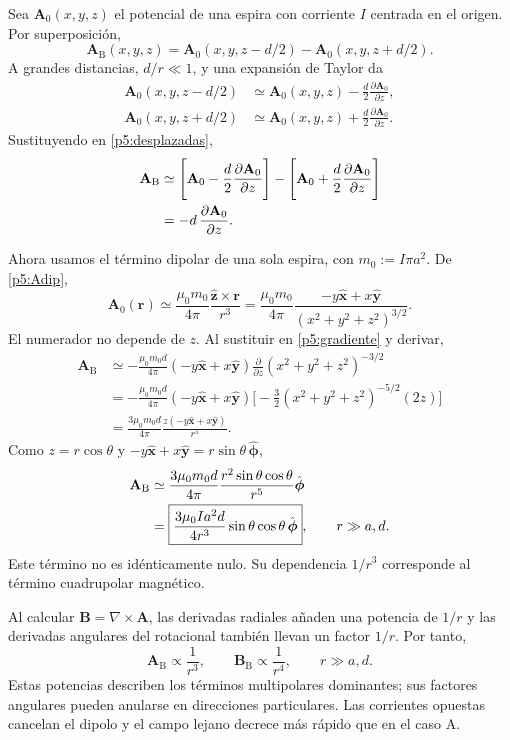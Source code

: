 \documentclass[11pt]{article}
\newcommand{\ex}{\hat{\mathbf{x}}}
\newcommand{\ey}{\hat{\mathbf{y}}}
\newcommand{\ez}{\hat{\mathbf{z}}}
\newcommand{\ep}{\hat{\boldsymbol{\phi}}}
\begin{document}
Sea $\mathbf A_0(x,y,z)$ el potencial de una espira con corriente
$I$ centrada en el origen. Por superposición,
\begin{equation}
  \mathbf A_{\mathrm B}(x,y,z)
    =\mathbf A_0(x,y,z-d/2)
      -\mathbf A_0(x,y,z+d/2).
  \label{p5:desplazadas}
\end{equation}
A grandes distancias, $d/r\ll1$, y una expansión de Taylor da
\begin{align*}
  \mathbf A_0(x,y,z-d/2)
    &\simeq\mathbf A_0(x,y,z)
      -\frac d2\frac{\partial\mathbf A_0}{\partial z},\\
  \mathbf A_0(x,y,z+d/2)
    &\simeq\mathbf A_0(x,y,z)
      +\frac d2\frac{\partial\mathbf A_0}{\partial z}.
\end{align*}
Sustituyendo en \eqref{p5:desplazadas},
\begin{align}
  \mathbf A_{\mathrm B}
    &\simeq
      \Biggl[\mathbf A_0-\frac d2
        \frac{\partial\mathbf A_0}{\partial z}\Biggr]
      -\Biggl[\mathbf A_0+\frac d2
        \frac{\partial\mathbf A_0}{\partial z}\Biggr]
      \notag\\
    &=-d\,\frac{\partial\mathbf A_0}{\partial z}.
      \label{p5:gradiente}
\end{align}

Ahora usamos el término dipolar de una sola espira,
con $m_0:=I\pi a^2$. De \eqref{p5:Adip},
\[
  \mathbf A_0(\mathbf r)
    \simeq\frac{\mu_0m_0}{4\pi}
      \frac{\ez\times\mathbf r}{r^3}
    =\frac{\mu_0m_0}{4\pi}
      \frac{-y\ex+x\ey}{(x^2+y^2+z^2)^{3/2}}.
\]
El numerador no depende de $z$. Al sustituir en
\eqref{p5:gradiente} y derivar,
\begin{align*}
  \mathbf A_{\mathrm B}
    &\simeq-\frac{\mu_0m_0d}{4\pi}
      (-y\ex+x\ey)
      \frac{\partial}{\partial z}
      (x^2+y^2+z^2)^{-3/2}\\
    &=-\frac{\mu_0m_0d}{4\pi}
      (-y\ex+x\ey)
      \Biggl[-\frac32(x^2+y^2+z^2)^{-5/2}(2z)\Biggr]\\
    &=\frac{3\mu_0m_0d}{4\pi}
      \frac{z(-y\ex+x\ey)}{r^5}.
\end{align*}
Como $z=r\cos\theta$ y $-y\ex+x\ey=r\sin\theta\,\ep$,
\begin{align}
  \mathbf A_{\mathrm B}
    &\simeq\frac{3\mu_0m_0d}{4\pi}
      \frac{r^2\sin\theta\cos\theta}{r^5}\ep
      \notag\\
    &=\boxed{
       \frac{3\mu_0Ia^2d}{4r^3}
       \sin\theta\cos\theta\,\ep
      },
      \qquad r\gg a,d.
      \label{p5:AB}
\end{align}
Este término no es idénticamente nulo. Su dependencia $1/r^3$
corresponde al término cuadrupolar magnético.

Al calcular $\mathbf B=\nabla\times\mathbf A$, las derivadas
radiales añaden una potencia de $1/r$ y las derivadas angulares
del rotacional también llevan un factor $1/r$. Por tanto,
\[
  \boxed{
    \mathbf A_{\mathrm B}\propto\frac1{r^3},
    \qquad
    \mathbf B_{\mathrm B}\propto\frac1{r^4},
    \qquad r\gg a,d.
  }
\]
Estas potencias describen los términos multipolares dominantes;
sus factores angulares pueden anularse en direcciones particulares.
Las corrientes opuestas cancelan el dipolo y el campo lejano
decrece más rápido que en el caso A.
\end{document}
